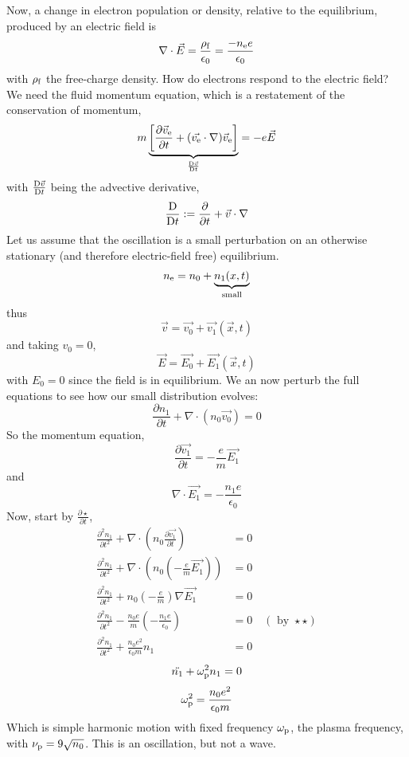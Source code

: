 \documentclass{book}         		                %
\begin{document}
Now, a change in electron population or density, relative to the
equilibrium, produced by an electric field is
\[ \nabla \cdot \vec{E} = \frac{\rho_{\rm f}}{\epsilon_0} = \frac{-n_{\rm
    e}e}{\epsilon_0} \] with $\rho_{\rm f}$ the free-charge density.
How do electrons respond to the electric field? We need the fluid
momentum equation, which is a restatement of the conservation of
momentum,
\begin{equation}
  \label{eq:fluidmom}
  m \underbrace{\left[ \frac{\partial \vec{v}_{\rm e}}{\partial t} + ( \vec{v_{\rm e}} \cdot \nabla) \vec{v}_{\rm e} \right]}_{\frac{{\rm D} \vec{v}}{{\rm D}t}} = -e \vec{E}
\end{equation}
with $\frac{{\rm D} \vec{v}}{{\rm D}t}$ being the advective derivative,
\[ \frac{\rm D}{{\rm D}t} := \frac{\partial}{\partial t} + \vec{v}
\cdot \nabla \] Let us assume that the oscillation is a small
perturbation on an otherwise stationary (and therefore electric-field
free) equilibrium.
\[ n_{\rm e} = n_0 + \underbrace{n_1(x,t)}_{{\rm small}} \]
thus
\[ \vec{v} = \vec{v_0}+\vec{v_1}(\vec{x},t) \]
and taking $v_0 = 0$,
\[ \vec{E} = \vec{E_0} + \vec{E_1}(\vec{x}, t) \]
with $E_0 = 0$ since the field is in equilibrium.
We an now perturb the full equations to see how our small distribution evolves:
\[ \frac{\partial n_1}{\partial t} + \nabla \cdot (n_0 \vec{v_0}) =
0  \tag{\star}\]
So the momentum equation,
\[ \frac{\partial \vec{v_1}}{\partial t} = - \frac{e}{m} \vec{E_1}  \tag{\star \star \star}\]
and
\[ \nabla \cdot \vec{E_1} = - \frac{n_1 e}{\epsilon_0} \tag{\star \star}\]
Now, start by   $\frac{\partial \star}{\partial t} $,
\begin{align}
  \frac{\partial^2 n_1}{\partial t^2} + \nabla \cdot \left( n_0 
\frac{\partial \vec{v_1} }{\partial t} \right) &= 0 \\
\frac{\partial^2 n_1}{\partial t^2}+ \nabla \cdot \left( n_{0} \left( - \frac{e}{m} \vec{E_1} \right)\right) &=0 \\
\frac{\partial^2 n_1}{\partial t^2} + n_0 (- \frac{e}{m}) \nabla \vec{E_1} &= 0  \\
\frac{\partial^2 n_1}{\partial t^2} - \frac{n_0 e}{m} (- \frac{n_1 e}{\epsilon_0}) &= 0 \quad(\text{ by } \star \star)\\
\frac{\partial^2 n_1}{\partial t^2} + \frac{n_0e^2}{\epsilon_0 m} n_1 &= 0
\end{align}
\[ \ddot{n_1} + \omega_{\rm p}^2 n_1 = 0 \]
\[ \omega_{\rm p}^2 = \frac{n_0 e^2}{\epsilon_0 m} \]
Which is simple harmonic motion with fixed frequency $\omega_{\rm p}$, the plasma frequency, with $\nu_{\rm p} = 9 \sqrt{n_0}$. This is an oscillation, but not a wave.
\end{document}
